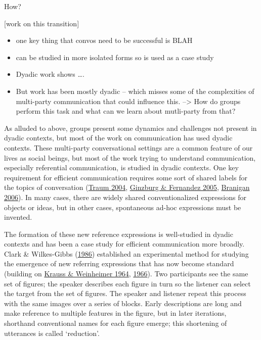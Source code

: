 \documentclass[
  english,
  a4paper,
]{article}
\providecommand{\tightlist}{%
  \setlength{\itemsep}{0pt}\setlength{\parskip}{0pt}}
\begin{document}
How?

{[}work on this transition{]}

\begin{itemize}
\tightlist
\item
  one key thing that convos need to be successful is BLAH
\item
  can be studied in more isolated forms so is used as a case study
\item
  Dyadic work shows \ldots.
\item
  But work has been mostly dyadic -- which misses some of the complexities of multi-party communication that could influence this. --\textgreater{} How do groups perform this task and what can we learn about mutli-party from that?
\end{itemize}

As alluded to above, groups present some dynamics and challenges not present in dyadic contexts, but most of the work on communication has used dyadic contexts.
These multi-party conversational settings are a common feature of our lives as social beings, but most of the work trying to understand communication, especially referential communication, is studied in dyadic contexts. One key requirement for efficient communication requires some sort of shared labels for the topics of conversation (\protect\hyperlink{ref-traum2004}{Traum 2004}, \protect\hyperlink{ref-ginzburg2005}{Ginzburg \& Fernandez 2005}, \protect\hyperlink{ref-branigan2006}{Branigan 2006}). In many cases, there are widely shared conventionalized expressions for objects or ideas, but in other cases, spontaneous ad-hoc expressions must be invented.

The formation of these new reference expressions is well-studied in dyadic contexts and has been a case study for efficient communication more broadly. Clark \& Wilkes-Gibbs (\protect\hyperlink{ref-clarkReferringCollaborativeProcess1986}{1986}) established an experimental method for studying the emergence of new referring expressions that has now become standard (building on \protect\hyperlink{ref-kraussChangesReferencePhrases1964}{Krauss \& Weinheimer 1964}, \protect\hyperlink{ref-kraussConcurrentFeedbackConfirmation1966}{1966}). Two participants see the same set of figures; the speaker describes each figure in turn so the listener can select the target from the set of figures. The speaker and listener repeat this process with the same images over a series of blocks. Early descriptions are long and make reference to multiple features in the figure, but in later iterations, shorthand conventional names for each figure emerge; this shortening of utterances is called `reduction'.
\end{document}
